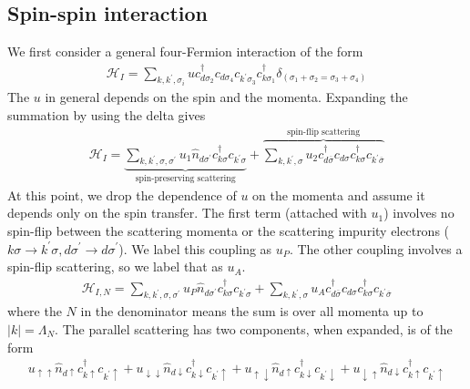\documentclass[twoside,11pt]{report}
\numberwithin{equation}{section}
\begin{document}
\subsection{Spin-spin interaction}
We first consider a general four-Fermion interaction of the form
\begin{equation}\begin{aligned}
	\mathcal{H}_I = \sum_{k,k^\prime ,\sigma_i}u c^\dagger_{d\sigma_2}c_{d\sigma_4}c_{k^\prime \sigma_3}c^\dagger_{k\sigma_1}\delta_{\left(\sigma_1 + \sigma_2 = \sigma_3 + \sigma_4\right)}
\end{aligned}\end{equation}
The \(u\) in general depends on the spin and the momenta. Expanding the summation by using the delta gives
\begin{equation}\begin{aligned}
\mathcal{H}_I = \underbrace{\sum_{k,k^\prime ,\sigma,\sigma^\prime}u_1 \hat n_{d\sigma^\prime}c^\dagger_{k\sigma}c_{k^\prime \sigma}}_\text{spin-preserving scattering} + \overbrace{\sum_{k,k^\prime ,\sigma}u_2 c^\dagger_{d\overline\sigma}c_{d\sigma}c^\dagger_{k\sigma}c_{k^\prime \overline\sigma}}^\text{spin-flip scattering}
\end{aligned}\end{equation}
At this point, we drop the dependence of \(u\) on the momenta and assume it depends only on the spin transfer. The first term (attached with \(u_1\)) involves no spin-flip between the scattering momenta or the scattering impurity electrons (\(k\sigma \to k^\prime \sigma, d\sigma^\prime \to d\sigma^\prime\)). We label this coupling as \(u_P\). The other coupling involves a spin-flip scattering, so we label that as \(u_A\).
\begin{equation}\begin{aligned}
\mathcal{H}_{I,N} = \sum_{k,k^\prime ,\sigma,\sigma^\prime}u_P \hat n_{d\sigma^\prime}c^\dagger_{k\sigma}c_{k^\prime\sigma}+ \sum_{k,k^\prime ,\sigma}u_A c^\dagger_{d\overline\sigma}c_{d\sigma}c^\dagger_{k\sigma}c_{k^\prime \overline\sigma}
\end{aligned}\end{equation}
where the \(N\) in the denominator means the sum is over all momenta up to \(|k| = \Lambda_N\). The parallel scattering has two components, when expanded, is of the form
\begin{equation}\begin{aligned}
u_{\uparrow\uparrow}\hat n_{d\uparrow}c^\dagger_{k\uparrow}c_{k^\prime\uparrow} + u_{\downarrow\downarrow}\hat n_{d\downarrow}c^\dagger_{k\downarrow}c_{k^\prime\uparrow} + u_{\uparrow\downarrow}\hat n_{d\uparrow}c^\dagger_{k\downarrow}c_{k^\prime\downarrow} + u_{\downarrow\uparrow}\hat n_{d\downarrow}c^\dagger_{k\uparrow}c_{k^\prime\uparrow}
\end{aligned}\end{equation}
\end{document}
